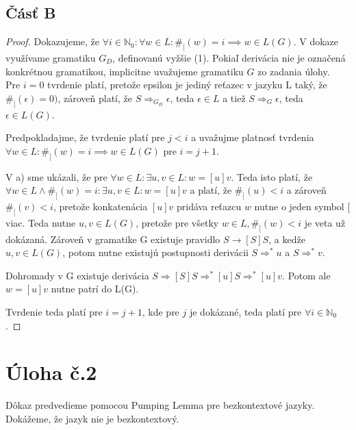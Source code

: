 \documentclass[10pt]{article}
\begin{document}
\subsection*{Čásť B}
\begin{proof}
    Dokazujeme, že $\forall i \in \mathbb{N}_0: \forall w \in L: \#_[(w) = i \implies w \in L(G)$. V dokaze
    využívame gramatiku $G_D$, definovanú vyžšie (1). Pokiaľ derivácia nie je označená konkrétnou
    gramatikou, implicitne uvažujeme gramatiku $G$ zo zadania úlohy.\\

    Pre $i = 0$ tvrdenie platí, pretože epsilon je jediný reťazec v jazyku L taký, že $\#_[(\epsilon)
    = 0)$, zároveň platí, že $S \Rightarrow_{G_D} \epsilon$, teda $\epsilon \in L$ a tiež $S
    \Rightarrow_{G} \epsilon$, teda $\epsilon \in L(G)$. 

    Predpokladajme, že tvrdenie platí pre $j <  i$ a uvažujme platnosť tvrdenia $\forall w \in L: \#_[(w) = i \implies w \in L(G)$
    pre $i = j+1$.
    
    V a) sme ukázali, že pre $\forall w \in L: \exists u,v \in L: w = [u]v$. Teda isto platí, že
    $\forall w \in L \land \#_[(w) = i: \exists u,v \in L: w = [u]v$ a platí, že $\#_[(u) < i$ a zároveň
    $\#_[(v) < i$, pretože konkatenácia $[u]v$ pridáva reťazcu $w$ nutne o jeden symbol $[$ viac.
    Teda nutne $u,v \in L(G)$, pretože pre všetky $w\in L, \#_[(w) < i$ je veta už dokázaná. 
    Zároveň v gramatike G existuje pravidlo $S\to [S]S$, a kedže $u,v \in L(G)$, potom nutne existujú
    postupnosti derivácii $S\Rightarrow^* u$ a $S\Rightarrow^* v$.

    Dohromady v G existuje derivácia $S\Rightarrow [S]S \Rightarrow^* [u]S \Rightarrow^* [u]v$. Potom ale $w = [u]v$
    nutne patrí do L(G).

    Tvrdenie teda platí pre $i = j + 1$, kde pre $j$ je dokázané, teda platí pre $\forall i \in
    \mathbb{N}_0$. 
\end{proof}


\section*{Úloha č.2}
Dôkaz predvedieme pomocou Pumping Lemma pre bezkontextové jazyky. Dokážeme, že jazyk nie je
bezkontextový.
\end{document}
